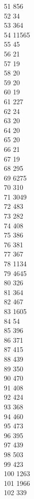 { 51	856 \\
 52	34 \\
 53	364 \\
 54	11565 \\
 55	45 \\
 56	21 \\
 57	19 \\
 58	20 \\
 59	20 \\
 60	19 \\
 61	227 \\
 62	24 \\
 63	20 \\
 64	20 \\
 65	20 \\
 66	21 \\
 67	19 \\
 68	295 \\
 69	6275 \\
 70	310 \\
 71	3049 \\
 72	483 \\
 73	282 \\
 74	408 \\
 75	386 \\
 76	381 \\
 77	367 \\
 78	1134 \\
 79	4645 \\
 80	326 \\
 81	364 \\
 82	467 \\
 83	1605 \\
 84	54 \\
 85	396 \\
 86	371 \\
 87	415 \\
 88	439 \\
 89	350 \\
 90	470 \\
 91	408 \\
 92	424 \\
 93	368 \\
 94	460 \\
 95	473 \\
 96	395 \\
 97	439 \\
 98	503 \\
 99	423 \\
 100	1263 \\
 101	1966 \\
 102	339 \\
}
